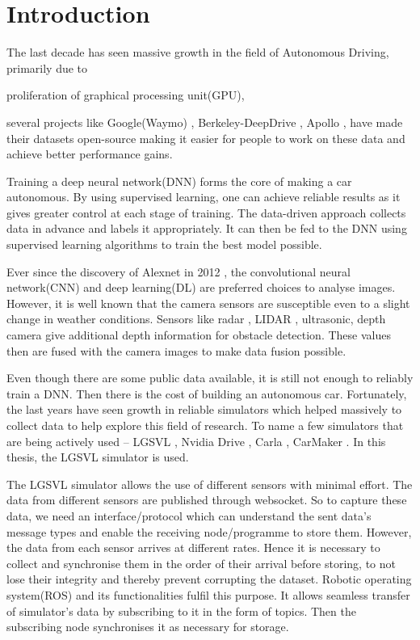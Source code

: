 \chapter{Introduction}

The last decade has seen massive growth in the field of Autonomous
Driving, primarily due to 
\begin{enumerate*}[label= \alph*)]
    \item proliferation of graphical processing unit(GPU),

    \item several projects like Google(Waymo) \cite{Waymo},
        Berkeley-DeepDrive \cite{Berkeley-DeepDrive},
        Apollo \cite{Apollo}, have made their datasets open-source making it
        easier for people to work on these data and achieve better performance gains. 
\end{enumerate*}



Training a deep neural network(DNN) forms the core of making a car autonomous. 
By using supervised learning, one can achieve reliable results as it gives greater control
at each stage of training. The data-driven approach collects data in advance and labels it
appropriately. It can then be fed to the DNN using supervised
learning algorithms to train the best model possible. 

Ever since the discovery of Alexnet in 2012 \cite{Alexnet2012}, the convolutional neural network(CNN) and
deep learning(DL) are preferred choices to analyse images.  However, it is well known that the camera sensors are susceptible even to a slight change in weather conditions. 
Sensors like radar \cite{Radar}, LIDAR \cite{LIDAR}, ultrasonic\cite{ultrasonic}, depth camera
give additional depth information for obstacle detection. These values then are fused with the camera images to make
data fusion possible. 

Even though there are some public data available, it is still not enough to reliably
train a DNN. Then there is  the cost of building an autonomous car. Fortunately, the last
years have seen growth in reliable simulators which
helped massively to collect data to help explore this field of research.
To name a few simulators that are being actively used -- LGSVL \cite{LGSVL}, Nvidia Drive
\cite{NvidiaSimulator}, Carla \cite{CarlaSimulator}, CarMaker \cite{CarMaker}. 
In this thesis, the LGSVL simulator is used.

The LGSVL simulator allows the use of different sensors with minimal effort. The data
from different sensors are published through websocket. So to capture these data, we
need an interface/protocol which can understand the sent data's message types and enable the
receiving node/programme to store them. However, the data from each sensor arrives at
different rates. Hence it is necessary to collect and synchronise them in the order of their arrival
before storing, to not lose their integrity and thereby prevent corrupting the dataset.
Robotic operating system(ROS) \cite{ROS2} and its functionalities fulfil
this purpose. It allows seamless transfer of simulator's data by subscribing to it in the
form of topics. Then the subscribing node synchronises it as necessary for storage.

